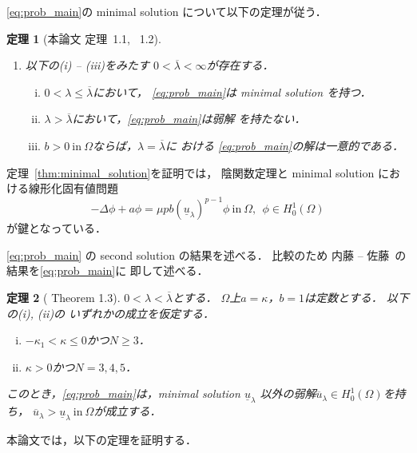\documentclass{jsarticle}
\newcommand{\sage}{
\addtolength{\itemindent}{1zw}
\addtolength{\parindent}{1zw}}
\theoremstyle{plain}
\newtheorem{thm}{定理}
\renewcommand{\bar}[1]{\overline{#1}}
\newcommand{\tin}{\text{in}~}
\begin{document}
\ref{eq:prob_main}の minimal solution について以下の定理が従う．
\begin{thm}[本論文 定理~1.1, ~1.2]
 \begin{enumerate}[1.] \sage
  \item 以下の(i) -- (iii)をみたす
        $0 < \bar{\lambda} < \infty$が存在する．
        \begin{enumerate}[(i)]
         \item $0 < \lambda \leq \bar{\lambda}$において，
               \ref{eq:prob_main}は minimal solution を持つ．
         \item $\lambda > \bar{\lambda}$において，\ref{eq:prob_main}は弱解
                を持たない．
         \item $b > 0 ~\tin \Omega$ならば，$\lambda = \bar{\lambda}$に
               おける
               \ref{eq:prob_main}の解は一意的である．
        \end{enumerate}
 \end{enumerate}
\end{thm}

定理~\ref{thm:minimal_solution}を証明では，
陰関数定理と minimal solution における線形化固有値問題
\[
-\Delta \phi + a \phi = \mu p b (\underline{u}_\lambda)^{p-1} \phi
  ~\tin \Omega, \ \ \phi \in H_0^1(\Omega)
\] 
が鍵となっている．

\ref{eq:prob_main} の second solution の結果を述べる．
比較のため 内藤 -- 佐藤~\cite{MR2886160}の結果を\ref{eq:prob_main}に
即して述べる．

\begin{thm}[\cite{MR2886160} Theorem 1.3]
 \label{thm:second_solution_naito_sato}
 $0 < \lambda < \bar{\lambda}$とする．
 $\Omega$上$a = \kappa$，$b = 1$は定数とする．
 以下の(i), (ii)の
 いずれかの成立を仮定する．
 \begin{enumerate}[(i)]
  \item $-\kappa_1 < \kappa \leq 0$かつ$N \geq 3$．
  \item $\kappa > 0$かつ$N = 3, 4, 5$．
 \end{enumerate}
 このとき，\ref{eq:prob_main}は，minimal solution
 $\underline{u}_\lambda$
 以外の弱解$\bar{u}_\lambda \in H_0^1(\Omega)$を持ち，
 $\bar{u}_\lambda >
 \underline{u}_\lambda ~\tin \Omega$が成立する．
\end{thm}

本論文では，以下の定理を証明する．
\end{document}
